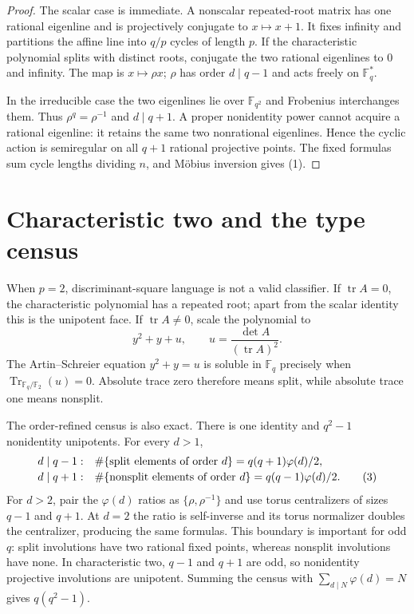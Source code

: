 \documentclass[10pt]{article}
\newcommand{\F}{\mathbb F}
\begin{document}
\begin{proof}
The scalar case is immediate.  A nonscalar repeated-root matrix has one
rational eigenline and is projectively conjugate to $x\mapsto x+1$.  It fixes
infinity and partitions the affine line into $q/p$ cycles of length $p$.
If the characteristic polynomial splits with distinct roots, conjugate the
two rational eigenlines to $0$ and infinity.  The map is $x\mapsto\rho x$;
$\rho$ has order $d\mid q-1$ and acts freely on $\F_q^*$.

In the irreducible case the two eigenlines lie over $\F_{q^2}$ and Frobenius
interchanges them.  Thus $\rho^q=\rho^{-1}$ and $d\mid q+1$.  A proper
nonidentity power cannot acquire a rational eigenline: it retains the same
two nonrational eigenlines.  Hence the cyclic action is semiregular on all
$q+1$ rational projective points.  The fixed formulas sum cycle lengths
dividing $n$, and M\"obius inversion gives (1).
\end{proof}

\section{Characteristic two and the type census}
When $p=2$, discriminant-square language is not a valid classifier.  If
$\operatorname{tr}A=0$, the characteristic polynomial has a repeated root;
apart from the scalar identity this is the unipotent face.  If
$\operatorname{tr}A\ne0$, scale the polynomial to
\[
 y^2+y+u,\qquad u=\frac{\det A}{(\operatorname{tr}A)^2}.                \tag{2}
\]
The Artin--Schreier equation $y^2+y=u$ is soluble in $\F_q$ precisely when
$\operatorname{Tr}_{\F_q/\F_2}(u)=0$.  Absolute trace zero therefore means
split, while absolute trace one means nonsplit.

The order-refined census is also exact.  There is one identity and
$q^2-1$ nonidentity unipotents.  For every $d>1$,
\[
\begin{array}{ll}
d\mid q-1:& \#\{\hbox{split elements of order }d\}
=q(q+1)\varphi(d)/2,\\[2pt]
d\mid q+1:& \#\{\hbox{nonsplit elements of order }d\}
=q(q-1)\varphi(d)/2.                                 \tag{3}
\end{array}
\]
For $d>2$, pair the $\varphi(d)$ ratios as
$\{\rho,\rho^{-1}\}$ and use torus centralizers of sizes $q-1$ and $q+1$.
At $d=2$ the ratio is self-inverse and its torus normalizer doubles the
centralizer, producing the same formulas.  This boundary is important for
odd $q$: split involutions have two rational fixed points, whereas nonsplit
involutions have none.  In characteristic two, $q-1$ and $q+1$ are odd, so
nonidentity projective involutions are unipotent.  Summing the census with
$\sum_{d\mid N}\varphi(d)=N$ gives $q(q^2-1)$.
\end{document}
